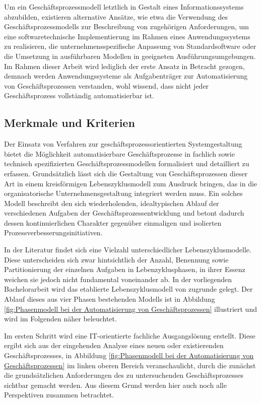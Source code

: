 Um ein Geschäftsprozessmodell letztlich in Gestalt eines Informationssystems abzubilden, existieren alternative Ansätze, wie etwa die Verwendung des Geschäftsprozessmodells zur Beschreibung von zugehörigen Anforderungen, um eine softwaretechnische Implementierung im Rahmen eines Anwendungssystems zu realisieren, die unternehmensspezifische Anpassung von Standardsoftware oder die Umsetzung in ausführbaren Modellen in geeigneten Ausführungsumgebungen.
\cite{Lehmann.2008} 
Im Rahmen dieser Arbeit wird lediglich der erste Ansatz in Betracht gezogen, demnach werden Anwendungssysteme als Aufgabenträger zur Automatisierung von Geschäftsprozessen verstanden, wohl wissend, dass nicht jeder Geschäftsprozess vollständig automatisierbar ist.

\subsection{Merkmale und Kriterien}
Der Einsatz von Verfahren zur geschäftsprozessorientierten Systemgestaltung bietet die Möglichkeit automatisierbare Geschäftsprozesse in fachlich sowie technisch spezifizierten Geschäftsprozessmodellen formalisiert und detailliert zu erfassen.
Grundsätzlich lässt sich die Gestaltung von Geschäftsprozessen dieser Art in einem kreisförmigen Lebenszyklusmodell zum Ausdruck bringen, das in die organisatorische Unternehmensgestaltung integriert werden muss. 
\cite{Scheer.1991}
Ein solches Modell beschreibt den sich wiederholenden, idealtypischen Ablauf der verschiedenen Aufgaben der Geschäftsprozessentwicklung und betont dadurch dessen kontinuierlichen Charakter gegenüber einmaligen und isolierten Prozessverbesserungsinitiativen.
\cite{Leiting.2012}

In der Literatur findet sich eine Vielzahl unterschiedlicher Lebenszyklusmodelle.
\cite{MacedodeMorais.2014} 
Diese unterscheiden sich zwar hintsichtlich der Anzahl, Benennung sowie Partitionierung der einzelnen Aufgaben in Lebenzyklusphasen, in ihrer Essenz weichen sie jedoch nicht fundamental voneinander ab.
\cite{Houy.2010}
In der vorliegenden Bachelorarbeit wird das etablierte Lebenszyklusmodell von \citeauthor{Scheer.1991}
\cite{Scheer.1991} zugrunde gelegt.
Der Ablauf dieses aus vier Phasen bestehenden Modells ist in Abbildung \ref{fig:Phasenmodell bei der Automatisierung von Geschäftsprozessen} illustriert und wird im Folgenden näher beleuchtet.

Im ersten Schritt wird eine \ac{IT}-orientierte fachliche Ausgangslösung erstellt.
Diese ergibt sich aus der eingehenden Analyse eines neuen oder existierenden Geschäftsprozesses, in Abbildung \ref{fig:Phasenmodell bei der Automatisierung von Geschäftsprozessen} im linken oberen Bereich veranschaulicht, durch die zunächst die grundsätzlichen Anforderungen des zu untersuchenden Geschäftsprozesses sichtbar gemacht werden.
\cite{Schwegmann.2002}
Aus diesem Grund werden hier auch noch alle Perspektiven zusammen betrachtet.

